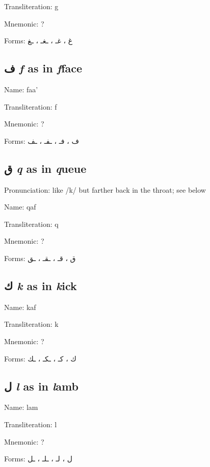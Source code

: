 \documentclass[11pt]{article}
\begin{document}
\noindent Transliteration: g

\noindent Mnemonic:  ?

\noindent Forms: \textarabic{غ ، غـ ، ـغـ ، ـغ}

\subsection{ \textarabic{ف} \textit{f} as in \textit{f}face}

\noindent Name: faa'

\noindent Transliteration: f

\noindent Mnemonic:  ?

\noindent Forms: \textarabic{ف ، فـ ، ـفـ ، ـف}

\subsection{ \textarabic{ق} \textit{q} as in \textit{q}ueue}
Pronunciation: like /k/ but farther back in the throat; see below

\noindent Name: qaf

\noindent Transliteration: q

\noindent Mnemonic:  ?

\noindent Forms: \textarabic{ق ، قـ ، ـقـ ، ـق}

\subsection{ \textarabic{ك} \textit{k} as in \textit{k}ick}

\noindent Name: kaf

\noindent Transliteration: k

\noindent Mnemonic:  ?

\noindent Forms: \textarabic{ك ، كـ ، ـكـ ، ـك}

\subsection{ \textarabic{ل} \textit{l} as in \textit{l}amb}

\noindent Name: lam

\noindent Transliteration: l

\noindent Mnemonic:  ?

\noindent Forms: \textarabic{ل ، لـ ، ـلـ ، ـل}
\end{document}
